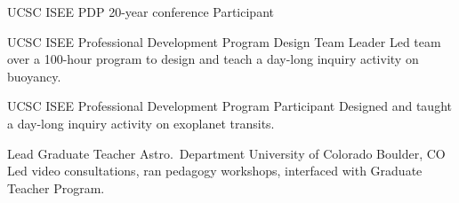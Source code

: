 \cventry{}
        {UCSC ISEE PDP 20-year conference}
        {Participant}
        {}{}{}

		{UCSC ISEE Professional Development Program}
		{Design Team Leader}
		{}
		{}
		{Led team over a 100-hour program to design and teach a day-long inquiry activity on buoyancy.}

		{UCSC ISEE Professional Development Program}
		{Participant}
		{}
		{}
		{Designed and taught a day-long inquiry activity on exoplanet transits.}

		{Lead Graduate Teacher}
		{Astro.~Department}
		{University of Colorado}
		{Boulder, CO}
		{Led video consultations, ran pedagogy workshops, interfaced with Graduate Teacher Program.}


